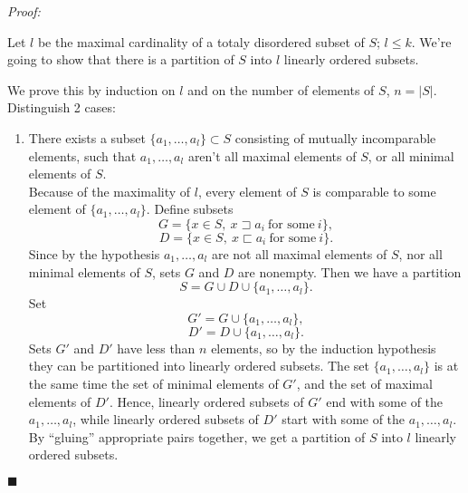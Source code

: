 \documentclass[a4paper, 10pt,oneside]{amsart}
\newenvironment{dokaz}
{\noindent\emph{Proof:}\ }
{\hfill $\blacksquare$}
\begin{document}
\begin{dokaz}

 Let $l$ be the maximal cardinality of a
totaly disordered subset of $S$; $l\leq k$. We're going to show that
there is a partition of
$S$ into $l$ linearly ordered subsets.

\noindent We prove this by induction on $l$ and on the number of elements
of $S$, $n=|S|$. Distinguish 2 cases:
\begin{enumerate}

\item There exists a subset $\{a_1,\dots,a_l\}\subset S$ consisting of mutually incomparable elements, such that $a_1,\dots,a_l$ aren't all maximal elements of $S$, or all minimal elements of $S$. \\
Because of the maximality of $l$, every element of $S$ is comparable to some element of $\{a_1,\dots,a_l\}$. Define subsets
$$G=\{x\in S,\ x\sqsupset a_i \ \textrm{for some}\ i\},$$
$$D=\{x\in S,\ x\sqsubset a_i \ \textrm{for some}\ i\}.$$
Since by the hypothesis $a_1,\dots,a_l$ are not all maximal elements of $S$,
nor all minimal elements of $S$, sets $G$ and $D$ are nonempty.
Then we have a partition $$S=G\cup D\cup \{a_1,\dots,a_l\}.$$  Set
$$G'=G\cup \{a_1,\dots,a_l\},$$
$$D'=D\cup \{a_1,\dots,a_l\}.$$
Sets $G'$ and $D'$ have less than $n$ elements, so by the
induction hypothesis they can be partitioned into linearly ordered
subsets. The set $\{a_1,\dots,a_l\}$ is at the same time the set
of minimal elements of $G'$, and the set of maximal elements of
$D'$. Hence, linearly ordered subsets of $G'$ end with some of the
$a_1,\dots,a_l$, while  linearly ordered subsets of $D'$ start
with some of the $a_1,\dots,a_l$. By ``gluing'' appropriate pairs
together, we get a partition of $S$ into $l$ linearly ordered
subsets.


\end{enumerate}
\end{dokaz}
\end{document}

